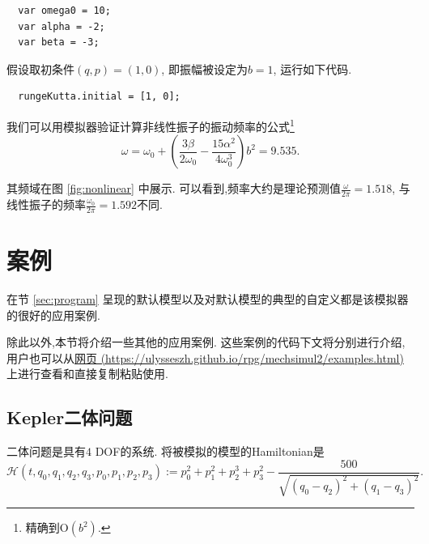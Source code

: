 \documentclass[12pt]{article}
\begin{document}
\begin{verbatim}
  var omega0 = 10;
  var alpha = -2;
  var beta = -3;
\end{verbatim}

假设取初条件$\left(q,p\right)=\left(1,0\right)$, 即振幅被设定为$b=1$, 运行如下代码.

\begin{verbatim}
  rungeKutta.initial = [1, 0];
\end{verbatim}

我们可以用模拟器验证计算非线性振子的振动频率的公式\cite[p. 87]{landau1976mechanics}\footnote{
  精确到$\mathrm O\left(b^2\right)$.
}
\begin{equation*}
  \omega=\omega_0+\left(\frac{3\beta}{2\omega_0}-\frac{15\alpha^2}{4\omega_0^3}\right)b^2=9.535.
\end{equation*}

其频域在图 \ref{fig:nonlinear} 中展示.
可以看到,频率大约是理论预测值$\frac\omega{2\pi}=1.518$,
与线性振子的频率$\frac{\omega_0}{2\pi}=1.592$不同.

\section{案例}
\label{sec:examples}

在节 \ref{sec:program} 呈现的默认模型以及对默认模型的典型的自定义都是该模拟器的很好的应用案例.

除此以外,本节将介绍一些其他的应用案例.
这些案例的代码下文将分别进行介绍, 用户也可以从\href{https://ulysseszh.github.io/rpg/mechsimul2/examples.html}{网页 (https://ulysseszh.github.io/rpg/mechsimul2/examples.html)} 上进行查看和直接复制粘贴使用.

\subsection{Kepler二体问题}

二体问题是具有$4$ DOF的系统.
将被模拟的模型的Hamiltonian是
\begin{equation*}
  \mathcal H\left(t,q_0,q_1,q_2,q_3,p_0,p_1,p_2,p_3\right):=
  p_0^2+p_1^2+p_2^3+p_3^2-\frac{500}{\sqrt{\left(q_0-q_2\right)^2+\left(q_1-q_3\right)^2}}.
\end{equation*}
\end{document}
